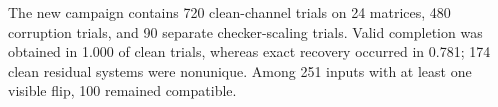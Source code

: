 The new campaign contains 720 clean-channel trials on 24 matrices, 480 corruption trials, and 90 separate checker-scaling trials. Valid completion was obtained in 1.000 of clean trials, whereas exact recovery occurred in 0.781; 174 clean residual systems were nonunique. Among 251 inputs with at least one visible flip, 100 remained compatible.
